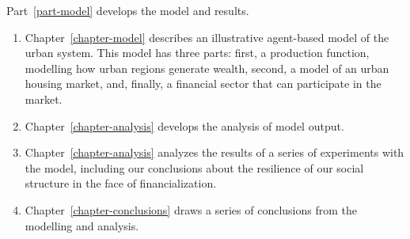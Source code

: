 Part~\ref{part-model} develops the model and results.
\begin{enumerate}
    \item Chapter~\ref{chapter-model} describes an illustrative agent-based model of the urban system. This model has three  parts: first, a production function, modelling how urban regions generate wealth,  second, a model of an urban housing market, and, finally, a financial sector that can participate in the market. 

    \item Chapter~\ref{chapter-analysis} develops the analysis of model output.

    \item Chapter~\ref{chapter-analysis} analyzes the results of a series of experiments with the model, including our conclusions about the resilience of our social structure in the face of financialization.

    \item Chapter~\ref{chapter-conclusions} draws a series of conclusions from the modelling and analysis.
\end{enumerate}

% 
